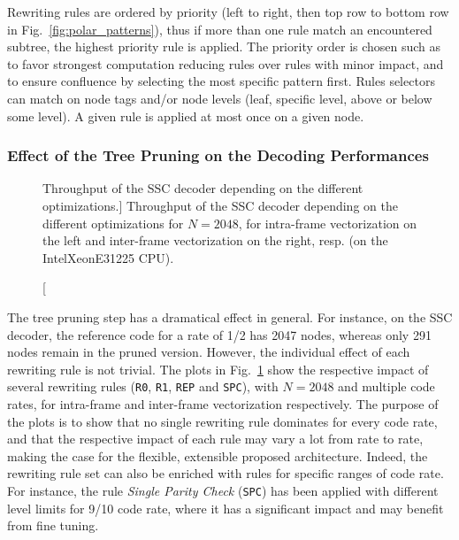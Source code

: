 Rewriting rules are ordered by priority (left to right, then top row to bottom
row in Fig.~\ref{fig:polar_patterns}), thus if more than one rule match an
encountered subtree, the highest priority rule is applied. The priority order is
chosen such as to favor strongest computation reducing rules over rules with
minor impact, and to ensure confluence by selecting the most specific pattern
first. Rules selectors can match on node tags and/or node levels (leaf, specific
level, above or below some level). A given rule is applied at most once on a
given node.

\subsubsection{Effect of the Tree Pruning on the Decoding Performances}

\begin{figure}[htp]
  \centering
  \quad
  \caption
    [Throughput of the SSC decoder depending on the different optimizations.]
    {Throughput of the SSC decoder depending on the different optimizations for
    $N = 2048$, for intra-frame vectorization on the left and inter-frame
    vectorization on the right, resp. (on the Intel\R Xeon\TM E31225 CPU).}
  \label{plot:polar_sc_tree_cut}
\end{figure}

The tree pruning step has a dramatical effect in general. For instance, on the
SSC decoder, the reference code for a rate of 1/2 has 2047 nodes, whereas only
291 nodes remain in the pruned version. However, the individual effect of each
rewriting rule is not trivial. The plots in Fig.~\ref{plot:polar_sc_tree_cut}
show the respective impact of several rewriting rules (\verb|R0|, \verb|R1|,
\verb|REP| and \verb|SPC|), with $N = 2048$ and multiple code rates, for
intra-frame and inter-frame vectorization respectively. The purpose of the plots
is to show that no single rewriting rule dominates for every code rate, and that
the respective impact of each rule may vary a lot from rate to rate, making the
case for the flexible, extensible proposed architecture. Indeed, the rewriting
rule set can also be enriched with rules for specific ranges of code rate. For
instance, the rule \emph{Single Parity Check} (\verb|SPC|) has been applied with
different level limits for 9/10 code rate, where it has a significant impact and
may benefit from fine tuning.


